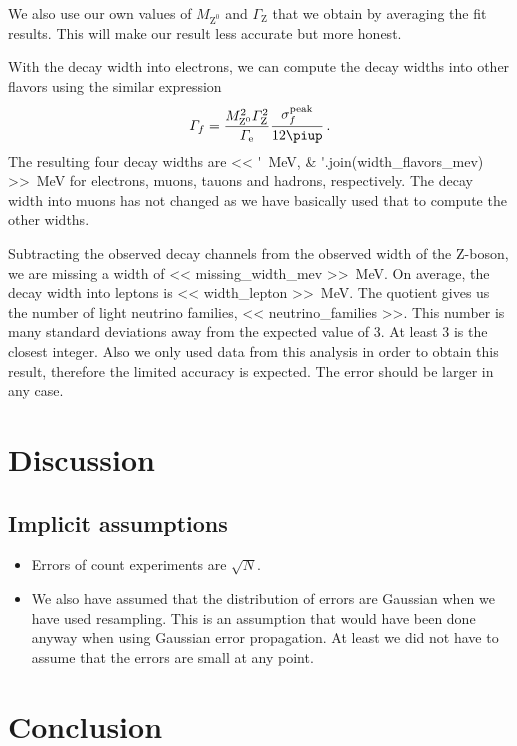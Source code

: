 \documentclass[11pt, english, fleqn, DIV=15, headinclude, BCOR=2cm]{scrreprt}
\newcommand\MZ{M_{\mathrm Z^0}}
\begin{document}
We also use our own values of $\MZ$ and $\Gamma_\mathrm Z$ that we obtain by
averaging the fit results. This will make our result less accurate but more
honest.

With the decay width into electrons, we can compute the decay widths into other
flavors using the similar expression
\[
    \Gamma_f = \frac{\MZ^2 \Gamma_\mathrm Z^2}{\Gamma_\mathrm e}
    \frac{\sigma_f^\text{peak}}{12 \piup} \,.
\]
The resulting four decay widths are \SIlist{<< ';'.join(width_flavors_mev)
>>}{\mega\electronvolt} for electrons, muons, tauons and hadrons, respectively.
The decay width into muons has not changed as we have basically used that to
compute the other widths.

Subtracting the observed decay channels from the observed width of the Z-boson,
we are missing a width of \SI{<< missing_width_mev >>}{\mega\electronvolt}. On
average, the decay width into leptons is \SI{<< width_lepton
>>}{\mega\electronvolt}. The quotient gives us the number of light neutrino
families, \num{<< neutrino_families >>}. This number is many standard
deviations away from the expected value of 3. At least 3 is the closest
integer. Also we only used data from this analysis in order to obtain this
result, therefore the limited accuracy is expected. The error should be larger
in any case.

\chapter{Discussion}

\section{Implicit assumptions}


\begin{itemize}
    \item
        Errors of count experiments are $\sqrt N$.

    \item
        We also have assumed that the distribution of errors are Gaussian when
        we have used resampling. This is an assumption that would have been
        done anyway when using Gaussian error propagation. At least we did not
        have to assume that the errors are small at any point.
\end{itemize}

\chapter{Conclusion}
\end{document}
